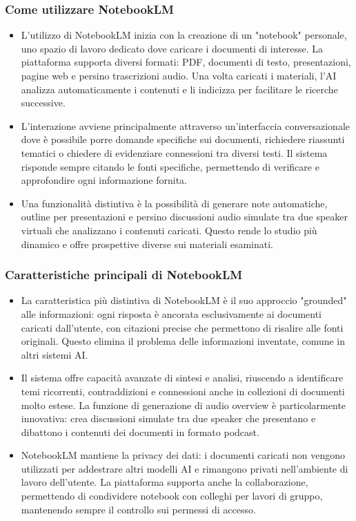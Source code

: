 \documentclass[aspectratio=169]{beamer}
\begin{document}
%
%
\begin{frame}
\frametitle{Come utilizzare NotebookLM}
\begin{itemize}
\item L'utilizzo di NotebookLM inizia con la creazione di un "notebook" personale, uno spazio di lavoro dedicato dove caricare i documenti di interesse. La piattaforma supporta diversi formati: PDF, documenti di testo, presentazioni, pagine web e persino trascrizioni audio. Una volta caricati i materiali, l'AI analizza automaticamente i contenuti e li indicizza per facilitare le ricerche successive.

\item L'interazione avviene principalmente attraverso un'interfaccia conversazionale dove è possibile porre domande specifiche sui documenti, richiedere riassunti tematici o chiedere di evidenziare connessioni tra diversi testi. Il sistema risponde sempre citando le fonti specifiche, permettendo di verificare e approfondire ogni informazione fornita.

\item Una funzionalità distintiva è la possibilità di generare note automatiche, outline per presentazioni e persino discussioni audio simulate tra due speaker virtuali che analizzano i contenuti caricati. Questo rende lo studio più dinamico e offre prospettive diverse sui materiali esaminati.
\end{itemize}
\end{frame}
%
%
\begin{frame}
\frametitle{Caratteristiche principali di NotebookLM}
\begin{itemize}
\item La caratteristica più distintiva di NotebookLM è il suo approccio "grounded" alle informazioni: ogni risposta è ancorata esclusivamente ai documenti caricati dall'utente, con citazioni precise che permettono di risalire alle fonti originali. Questo elimina il problema delle informazioni inventate, comune in altri sistemi AI.

\item Il sistema offre capacità avanzate di sintesi e analisi, riuscendo a identificare temi ricorrenti, contraddizioni e connessioni anche in collezioni di documenti molto estese. La funzione di generazione di audio overview è particolarmente innovativa: crea discussioni simulate tra due speaker che presentano e dibattono i contenuti dei documenti in formato podcast.

\item NotebookLM mantiene la privacy dei dati: i documenti caricati non vengono utilizzati per addestrare altri modelli AI e rimangono privati nell'ambiente di lavoro dell'utente. La piattaforma supporta anche la collaborazione, permettendo di condividere notebook con colleghi per lavori di gruppo, mantenendo sempre il controllo sui permessi di accesso.
\end{itemize}
\end{frame}
\end{document}
